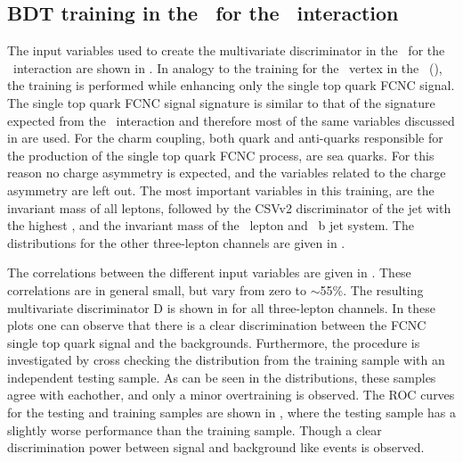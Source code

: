 \clearpage	
\subsection{BDT training in the \STSR\ for the \Zct\ interaction}
\label{sec:BDTSTSRZCT}
The input variables used to create the multivariate discriminator in the \STSR\ for the \Zct\ interaction are shown in . In analogy to the training for the \Zut\ vertex in the \STSR\ (), the training is performed while enhancing only the single top quark FCNC signal. The single top quark FCNC  signal signature is similar to that of the signature expected from the \Zut\ interaction and therefore most of the same variables discussed in  are used. For the charm coupling, both quark and anti-quarks responsible for the production of the single top quark FCNC process, are sea quarks. For this reason no charge asymmetry is expected, and the variables related to the charge asymmetry are left out.
 The most important variables in this training,  are the invariant mass of all leptons,  followed by the CSVv2 discriminator of the jet with the highest \pt, and the invariant mass of the \PW\ lepton and \SM\ b jet system. The distributions for the other three-lepton channels are given in .
 
 
The correlations between the different input variables are given in . These correlations are in general small, but vary from zero to $\sim$55\%.
The resulting multivariate discriminator D is shown in  for all three-lepton channels. In these plots one can observe that there is a clear discrimination between the FCNC single top quark signal and the backgrounds. Furthermore, the procedure is investigated by cross checking the distribution from the training sample with an independent testing sample. As can be seen in the distributions, these samples agree with eachother, and only a minor overtraining is observed. The ROC curves for the testing and training samples are shown in , where the testing sample has a slightly worse performance than the training sample. Though a clear discrimination power between signal and background like events is observed. 

